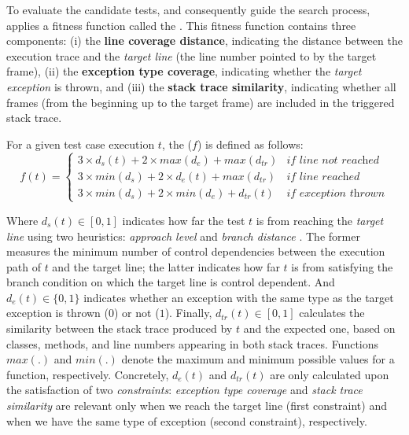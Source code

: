 To evaluate the candidate tests, and consequently guide the search process, \SGGA applies a fitness function called the \CrashFunction. This fitness function contains three components: 
(i) the \textbf{line coverage distance}, indicating the distance between the execution trace and the \emph{target line} (the line number pointed to by the target frame), 
(ii) the \textbf{exception type coverage}, indicating whether the \emph{target exception} is thrown, and 
(iii) the \textbf{stack trace similarity}, indicating whether all frames (from the beginning up to the target frame) are included in the triggered stack trace.
%
\begin{definition}
For a given test case execution $t$, the \CrashFunction ($f$) is defined as follows:
\begin{equation}
f(t) = 
\left\{
    \begin{array}{ll}
      3 \times d_{s}(t) + 2 \times max(d_{e}) + max(d_{tr}) & \textit{if line not reached}\\
      3 \times min(d_{s}) + 2 \times d_{e}(t) + max(d_{tr}) & \textit{if line reached}\\
      3 \times min(d_{s}) + 2 \times min(d_{e}) + d_{tr}(t) & \textit{if exception thrown}
    \end{array}
  \right.
 \end{equation}
\end{definition}
%
Where $d_{s}(t) \in [0,1]$ indicates how far the test $t$ is from reaching the \textit{target line} using two heuristics: \textit{approach level} and \textit{branch distance} \cite{McMinn2004}. The former measures the minimum number of control dependencies between the execution path of $t$ and the target line; the latter indicates how far $t$ is from satisfying the branch condition on which the target line is control dependent.
And $d_{e}(t) \in \{0,1\}$ indicates whether an exception with the same type as the target exception is thrown ($0$) or not ($1$). 
Finally, $d_{tr}(t) \in [0,1]$ calculates the similarity between the stack trace produced by $t$ and the expected one, based on classes, methods, and line numbers appearing in both stack traces.
Functions $max(.)$ and $min(.)$ denote the maximum and minimum possible values for a function, respectively. Concretely, $d_{e}(t)$ and $d_{tr}(t)$ are only calculated upon the satisfaction of two \textit{constraints}: \textit{exception type coverage} and \textit{stack trace similarity} are relevant only when we reach the target line (first constraint) and when we have the same type of exception (second constraint), respectively.

